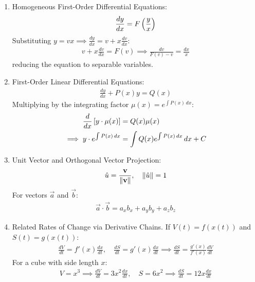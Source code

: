 \begin{enumerate}[label=\thesubsection.\arabic*, ref=\thesubsection.\theenumi]
		\item Homogeneous First-Order Differential Equations:
		\begin{align}
			\frac{dy}{dx} = F\left(\frac{y}{x}\right) \label{eq:CBSE12-2019-homogeneous_ode}
		\end{align}
		\solution
		Substituting $y = vx \implies \frac{dy}{dx} = v + x\frac{dv}{dx}$:
		\begin{align}
			v + x\frac{dv}{dx} = F(v) \implies \frac{dv}{F(v) - v} = \frac{dx}{x} \label{eq:CBSE12-2019-homog_separable}
		\end{align}
		reducing the equation to separable variables.
		
		\item First-Order Linear Differential Equations:
		\begin{align}
			\frac{dy}{dx} + P(x)y = Q(x) \label{eq:CBSE12-2019-linear_ode}
		\end{align}
		\solution
		Multiplying by the integrating factor $\mu(x) = e^{\int P(x) \, dx}$:
		\begin{align}
			\frac{d}{dx}{}\left[y \cdot \mu(x)\right] &= Q(x)\mu(x) \\
			\implies y \cdot e^{\int P(x) \, dx} &= \int Q(x) e^{\int P(x) \, dx} \, dx + C \label{eq:CBSE12-2019-linear_ode_sol}
		\end{align}
		
		\item Unit Vector and Orthogonal Vector Projection:
		\begin{align}
			\hat{u} = \frac{\mathbf{v}}{\left\lVert\mathbf{v}\right\rVert}, \quad \left\lVert\hat{u}\right\rVert = 1 \label{eq:CBSE12-2019-unit_vector}
		\end{align}
		For vectors $\vec{a}$ and $\vec{b}$:
		\begin{align}
			\vec{a} \cdot \vec{b} = a_x b_x + a_y b_y + a_z b_z \label{eq:CBSE12-2019-dot_product}
		\end{align}
		
		\item Related Rates of Change via Derivative Chains.
		If $V(t) = f(x(t))$ and $S(t) = g(x(t))$:
		\begin{align}
			\frac{dV}{dt} = f'(x)\frac{dx}{dt}, \quad \frac{dS}{dt} = g'(x)\frac{dx}{dt} \implies \frac{dS}{dt} = \frac{g'(x)}{f'(x)}\frac{dV}{dt} \label{eq:CBSE12-2019-related_rates}
		\end{align}
		For a cube with side length $x$:
		\begin{align}
			V = x^3 \implies \frac{dV}{dt} = 3x^2 \frac{dx}{dt}, \quad S = 6x^2 \implies \frac{dS}{dt} = 12x \frac{dx}{dt} \label{eq:CBSE12-2019-cube_rates}
		\end{align}
		

\end{enumerate}
